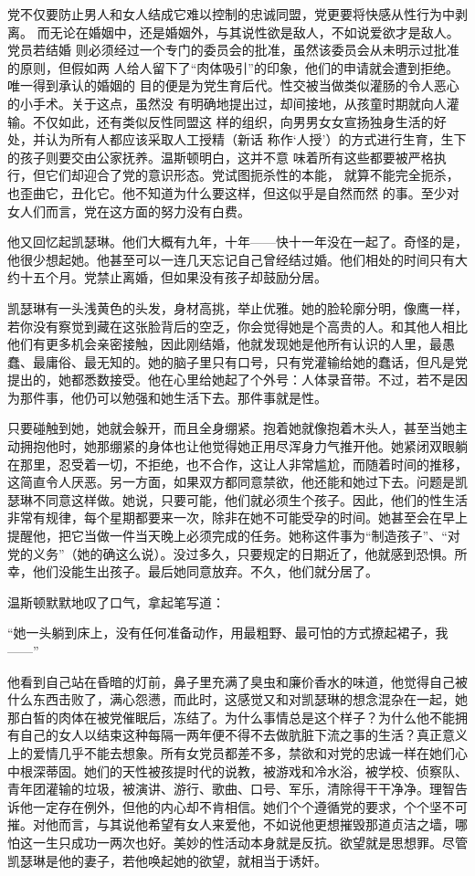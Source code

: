 党不仅要防止男人和女人结成它难以控制的忠诚同盟，党更要将快感从性行为中剥离。
而无论在婚姻中，还是婚姻外，与其说性欲是敌人，不如说爱欲才是敌人。党员若结婚
则必须经过一个专门的委员会的批准，虽然该委员会从未明示过批准的原则，但假如两
人给人留下了``肉体吸引''的印象，他们的申请就会遭到拒绝。唯一得到承认的婚姻的
目的便是为党生育后代。性交被当做类似灌肠的令人恶心的小手术。关于这点，虽然没
有明确地提出过，却间接地，从孩童时期就向人灌输。不仅如此，还有类似反性同盟这
样的组织，向男男女女宣扬独身生活的好处，并认为所有人都应该采取人工授精（新话
称作`人授'）的方式进行生育，生下的孩子则要交由公家抚养。温斯顿明白，这并不意
味着所有这些都要被严格执行，但它们却迎合了党的意识形态。党试图扼杀性的本能，
就算不能完全扼杀，也歪曲它，丑化它。他不知道为什么要这样，但这似乎是自然而然
的事。至少对女人们而言，党在这方面的努力没有白费。

他又回忆起凯瑟琳。他们大概有九年，十年——快十一年没在一起了。奇怪的是，他很少想起她。他甚至可以一连几天忘记自己曾经结过婚。他们相处的时间只有大约十五个月。党禁止离婚，但如果没有孩子却鼓励分居。

凯瑟琳有一头浅黄色的头发，身材高挑，举止优雅。她的脸轮廓分明，像鹰一样，若你没有察觉到藏在这张脸背后的空乏，你会觉得她是个高贵的人。和其他人相比他们有更多机会亲密接触，因此刚结婚，他就发现她是他所有认识的人里，最愚蠢、最庸俗、最无知的。她的脑子里只有口号，只有党灌输给她的蠢话，但凡是党提出的，她都悉数接受。他在心里给她起了个外号：人体录音带。不过，若不是因为那件事，他仍可以勉强和她生活下去。那件事就是性。

只要碰触到她，她就会躲开，而且全身绷紧。抱着她就像抱着木头人，甚至当她主动拥抱他时，她那绷紧的身体也让他觉得她正用尽浑身力气推开他。她紧闭双眼躺在那里，忍受着一切，不拒绝，也不合作，这让人非常尴尬，而随着时间的推移，这简直令人厌恶。另一方面，如果双方都同意禁欲，他还能和她过下去。问题是凯瑟琳不同意这样做。她说，只要可能，他们就必须生个孩子。因此，他们的性生活非常有规律，每个星期都要来一次，除非在她不可能受孕的时间。她甚至会在早上提醒他，把它当做一件当天晚上必须完成的任务。她称这件事为``制造孩子''、``对党的义务''（她的确这么说）。没过多久，只要规定的日期近了，他就感到恐惧。所幸，他们没能生出孩子。最后她同意放弃。不久，他们就分居了。

温斯顿默默地叹了口气，拿起笔写道：

``她一头躺到床上，没有任何准备动作，用最粗野、最可怕的方式撩起裙子，我——''

他看到自己站在昏暗的灯前，鼻子里充满了臭虫和廉价香水的味道，他觉得自己被什么东西击败了，满心怨懑，而此时，这感觉又和对凯瑟琳的想念混杂在一起，她那白皙的肉体在被党催眠后，冻结了。为什么事情总是这个样子？为什么他不能拥有自己的女人以结束这种每隔一两年便不得不去做肮脏下流之事的生活？真正意义上的爱情几乎不能去想象。所有女党员都差不多，禁欲和对党的忠诚一样在她们心中根深蒂固。她们的天性被孩提时代的说教，被游戏和冷水浴，被学校、侦察队、青年团灌输的垃圾，被演讲、游行、歌曲、口号、军乐，清除得干干净净。理智告诉他一定存在例外，但他的内心却不肯相信。她们个个遵循党的要求，个个坚不可摧。对他而言，与其说他希望有女人来爱他，不如说他更想摧毁那道贞洁之墙，哪怕这一生只成功一两次也好。美妙的性活动本身就是反抗。欲望就是思想罪。尽管凯瑟琳是他的妻子，若他唤起她的欲望，就相当于诱奸。


